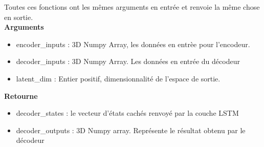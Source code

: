     Toutes ces fonctions ont les mêmes arguments en entrée et renvoie la même chose en sortie.\\
        \textbf{Arguments} \\
        \begin{itemize}
            \item encoder\_inputs : 3D Numpy Array, les données en entrèe pour l'encodeur.
            \item decoder\_inputs : 3D Numpy Array. Les données en entrée du décodeur
            \item latent\_dim : Entier positif, dimensionnalité de l'espace de sortie.
        \end{itemize}
        \textbf{Retourne}
        \begin{itemize}
            \item decoder\_states : le vecteur d'états cachés renvoyé par la couche LSTM
            \item decoder\_outputs : 3D Numpy array. Représente le résultat obtenu par le décodeur
        \end{itemize}
    
    
